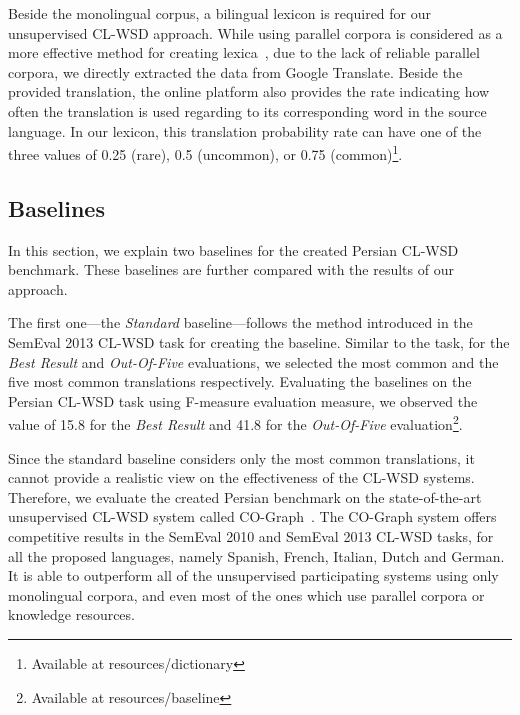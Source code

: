 Beside the monolingual corpus, a bilingual lexicon is required for our unsupervised CL-WSD approach. %
While using  parallel corpora is considered as a more effective method for creating  lexica~\cite{duque2015choosing}, due to the lack of reliable parallel corpora, we directly extracted the data from Google Translate. Beside the provided translation, the online platform also provides the rate indicating how often the translation is used regarding to its corresponding word in the source language. In our lexicon, this translation probability rate can have one of the three values of 0.25 (rare), 0.5 (uncommon), or 0.75 (common)\footnote{Available at resources/dictionary}. 

\vspace{-0.2cm}
\subsection{Baselines}
In this section, we explain two baselines for the created Persian CL-WSD benchmark. These baselines are further compared with the results of our approach.

The first one---the \emph{Standard} baseline---follows the method introduced in the SemEval 2013 CL-WSD task for creating the baseline. Similar to the task, for the \emph{Best Result} and \emph{Out-Of-Five} evaluations, we selected the most common and the five most common translations respectively. %
Evaluating the baselines on the Persian CL-WSD task using F-measure evaluation measure, we observed the value of 15.8 for the \emph{Best Result} and 41.8 for the \emph{Out-Of-Five} evaluation\footnote{Available at resources/baseline}. 

Since the standard baseline considers only the most common translations, it cannot provide a realistic view on the effectiveness of the CL-WSD systems. Therefore, we evaluate the created Persian benchmark on the state-of-the-art unsupervised CL-WSD system called CO-Graph~\cite{duqueco}. The CO-Graph system offers competitive results in the SemEval 2010 and SemEval 2013 CL-WSD tasks, for all the proposed languages, namely Spanish, French, Italian, Dutch and German. It is able to outperform all of the unsupervised participating systems using only monolingual corpora, and even most of the ones which use parallel corpora or knowledge resources.

